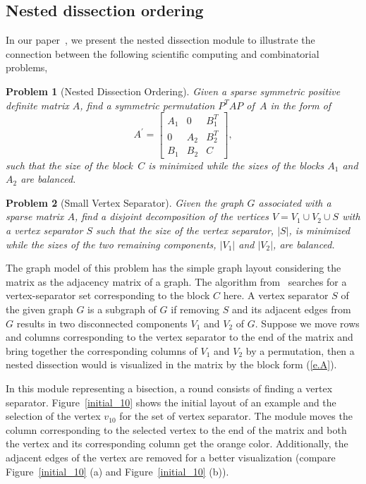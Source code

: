 \documentclass[12pt, twoside,a4paper,toc=bibliography]{scrbook}
\newtheorem{problem}{Problem}
\newcommand{\figref}[1]{Figure~\protect\ref{#1}}
\begin{document}
\subsection{Nested dissection ordering}
In our paper~\cite{2014:02}, we present the nested dissection module to
illustrate the connection between the following scientific computing and combinatorial problems,
\begin{problem}[Nested Dissection Ordering]
\label{p.nest.dissect}
Given a sparse symmetric positive
definite matrix $A$, find a symmetric permutation $P^T A P$ of~$A$ in the form of
\begin{equation}
\label{e.A}
A^{\prime} =
\begin{bmatrix}
A_1 & 0   & B_1^T \\[0.2em]
0   & A_2 & B_2^T \\[0.2em]
B_1 & B_2 & C
\end{bmatrix} ,
\end{equation}
such that the size of the block~$C$ is minimized while the sizes of the blocks $A_1$ and $A_2$ are
balanced.

\end{problem}
\begin{problem}[Small Vertex Separator]
\label{p.small.ver.sep} Given the graph $G$ associated with a sparse
matrix $A$, find a disjoint decomposition of the vertices $V = V_1 \cup V_2 \cup S$ with a vertex
separator $S$ such that the size of the vertex separator, $|S|$, is minimized while the sizes of
the two remaining components, $|V_1|$ and $|V_2|$, are balanced.
\end{problem}

The graph model of this problem has the simple graph layout considering the matrix
as the adjacency matrix of a graph.
The algorithm from~\cite{2014:02} searches for a vertex-separator set
corresponding to the block $C$ here. A vertex separator $S$ of the given graph $G$
is a subgraph of $G$ if removing $S$ and its adjacent edges from $G$ results in two
disconnected components $V_1$ and $V_2$ of $G$.
Suppose we move rows and columns corresponding to the vertex separator to the end of
the matrix and bring together
the corresponding columns of $V_1$ and $V_2$ by a permutation,
then a nested dissection would is visualized in the matrix by the block form (\ref{e.A}).

In this module representing a bisection, a round consists of finding a vertex separator.
Figure~\ref{initial_10} shows the initial layout of an example
and the selection of the vertex $v_{10}$ for the set of vertex separator.
The module moves the
column corresponding to the selected vertex to the end of the matrix
and both the vertex and its corresponding column get the orange color.
Additionally, the adjacent edges of the vertex are removed for a better visualization
(compare \figref{initial_10} (a) and \figref{initial_10} (b)).
\end{document}
